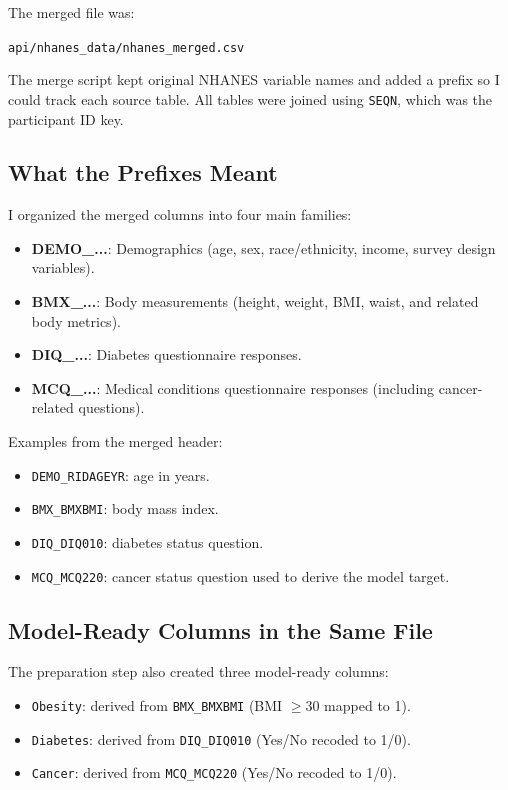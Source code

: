 \documentclass[12pt]{article}
\begin{document}
The merged file was:
\begin{center}
\texttt{api/nhanes\_data/nhanes\_merged.csv}
\end{center}

The merge script kept original NHANES variable names and added a prefix so I could track each source table.
All tables were joined using \texttt{SEQN}, which was the participant ID key.

\subsection{What the Prefixes Meant}

I organized the merged columns into four main families:
\begin{itemize}
	\item \textbf{DEMO\_...}: Demographics (age, sex, race/ethnicity, income, survey design variables).
	\item \textbf{BMX\_...}: Body measurements (height, weight, BMI, waist, and related body metrics).
	\item \textbf{DIQ\_...}: Diabetes questionnaire responses.
	\item \textbf{MCQ\_...}: Medical conditions questionnaire responses (including cancer-related questions).
\end{itemize}

Examples from the merged header:
\begin{itemize}
	\item \texttt{DEMO\_RIDAGEYR}: age in years.
	\item \texttt{BMX\_BMXBMI}: body mass index.
	\item \texttt{DIQ\_DIQ010}: diabetes status question.
	\item \texttt{MCQ\_MCQ220}: cancer status question used to derive the model target.
\end{itemize}

\subsection{Model-Ready Columns in the Same File}

The preparation step also created three model-ready columns:
\begin{itemize}
	\item \texttt{Obesity}: derived from \texttt{BMX\_BMXBMI} (BMI $\geq 30$ mapped to 1).
	\item \texttt{Diabetes}: derived from \texttt{DIQ\_DIQ010} (Yes/No recoded to 1/0).
	\item \texttt{Cancer}: derived from \texttt{MCQ\_MCQ220} (Yes/No recoded to 1/0).
\end{itemize}
\end{document}
